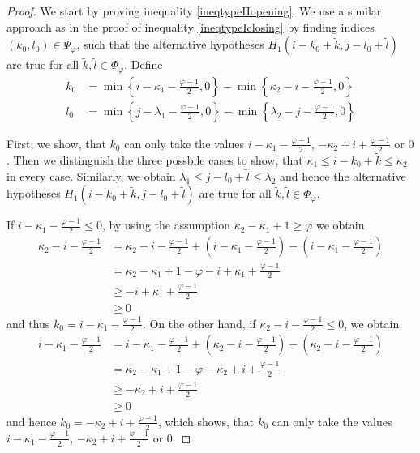 \documentclass[a4paper,12pt]{article}
\theoremstyle{plain}
\theoremstyle{definition}
\begin{document}
\begin{proof}
	We start by proving inequality \eqref{ineqtypeIIopening}. We use a similar approach as in the proof of inequality \eqref{ineqtypeIclosing} by finding indices $(k_0, l_0) \in \Psi_\varphi$, such that the alternative hypotheses $H_1(i - k_0 + \tilde{k}, j - l_0 + \tilde{l})$ are true for all $\tilde{k}, \tilde{l} \in \Phi_\varphi$. Define
	\begin{align*}
		k_0 &= \min \left\{ i - \kappa_1 - \frac{\varphi - 1}{2}, 0 \right\} - \min \left\{ \kappa_2 - i - \frac{\varphi - 1}{2}, 0 \right\} \\
		l_0 &= \min \left\{ j - \lambda_1 - \frac{\varphi - 1}{2}, 0 \right\} - \min \left\{ \lambda_2 - j - \frac{\varphi - 1}{2}, 0 \right\}
	\end{align*}
	
	First, we show, that $k_0$ can only take the values $i - \kappa_1 - \frac{\varphi - 1}{2}$, $- \kappa_2 + i + \frac{\varphi - 1}{2}$ or $0$. Then we distinguish the three possbile cases to show, that $\kappa_1 \leq i - k_0 + \tilde{k} \leq \kappa_2$ in every case. Similarly, we obtain $\lambda_1 \leq j - l_0 + \tilde{l} \leq \lambda_2$ and hence the alternative hypotheses $H_1(i - k_0 + \tilde{k}, j - l_0 + \tilde{l})$ are true for all $\tilde{k}, \tilde{l} \in \Phi_\varphi$.
	
	If $i - \kappa_1 - \frac{\varphi - 1}{2} \leq 0$, by using the assumption $\kappa_2 - \kappa_1 + 1 \geq \varphi$ we obtain
	\begin{align*}
		\kappa_2 - i - \frac{\varphi - 1}{2} &= \kappa_2 - i - \frac{\varphi - 1}{2} + \left( i - \kappa_1 - \frac{\varphi - 1}{2} \right) - \left( i - \kappa_1 - \frac{\varphi - 1}{2} \right) \\
		&= \kappa_2 - \kappa_1 + 1 - \varphi - i + \kappa_1 + \frac{\varphi - 1}{2} \\
		&\geq - i + \kappa_1 + \frac{\varphi - 1}{2} \\
		&\geq 0
	\end{align*}
	and thus $k_0 = i - \kappa_1 - \frac{\varphi - 1}{2}$. On the other hand, if $\kappa_2 - i - \frac{\varphi - 1}{2} \leq 0$, we obtain
	\begin{align*}
		i - \kappa_1 - \frac{\varphi - 1}{2} &= i - \kappa_1 - \frac{\varphi - 1}{2} + \left( \kappa_2 - i - \frac{\varphi - 1}{2} \right) - \left( \kappa_2 - i - \frac{\varphi - 1}{2} \right) \\
		&= \kappa_2 - \kappa_1 + 1 - \varphi - \kappa_2 + i + \frac{\varphi - 1}{2} \\
		&\geq - \kappa_2 + i + \frac{\varphi - 1}{2} \\
		&\geq 0
	\end{align*}
	and hence $k_0 = - \kappa_2 + i + \frac{\varphi - 1}{2}$, which shows, that $k_0$ can only take the values $i - \kappa_1 - \frac{\varphi - 1}{2}$, $- \kappa_2 + i + \frac{\varphi - 1}{2}$ or $0$.
	

\end{proof}
\end{document}
